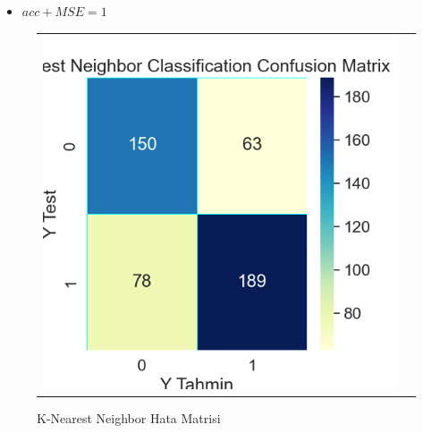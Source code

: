 \documentclass[conference]{IEEEtran}
\begin{document}
\begin{itemize}
\item $acc + MSE = 1$
\end{itemize}

\begin{figure}[!h]
	\centering
	\begin{center}
		\begin{tabular}{cc}
			\includegraphics[scale=0.45]{pictures/pic_10.png}&
		\end{tabular}
	\end{center}
	\caption{K-Nearest Neighbor Hata Matrisi}
	\label{fig:10}
\end{figure}
\pagebreak
\end{document}
